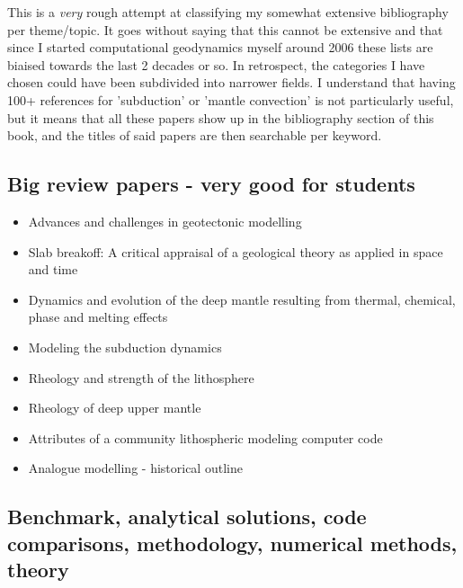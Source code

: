 This is a {\it very} rough attempt at classifying my somewhat extensive 
bibliography per theme/topic.
It goes without saying that this cannot be extensive and that since I 
started computational geodynamics myself around 2006 these lists are 
biaised towards the last 2 decades or so. 
In retrospect, the categories I have chosen could have been subdivided
into narrower fields. I understand that having 100+ references 
for 'subduction'  or 'mantle convection' is not particularly useful, 
but it means that all these papers show up in the bibliography section 
of this book, and the titles of said papers are then searchable per keyword.

\subsection*{Big review papers - very good for students}

\begin{itemize}
\item Advances and challenges in geotectonic modelling \cite{bufy14}
\item Slab breakoff: A critical appraisal of a geological theory as applied in space and time \cite{garm18}
\item Dynamics and evolution of the deep mantle resulting from thermal, chemical, phase and melting effects \cite{tack12}
\item Modeling the subduction dynamics \cite{kinc95,bill08}
\item Rheology and strength of the lithosphere \cite{kirb83,buro11}
\item Rheology of deep upper mantle \cite{kara10}
\item Attributes of a community lithospheric modeling computer code \cite{comc15}
\item Analogue modelling - historical outline \cite{koyi97}
\end{itemize}


\subsection*{Benchmark, analytical solutions, code comparisons, methodology, numerical methods, theory}

